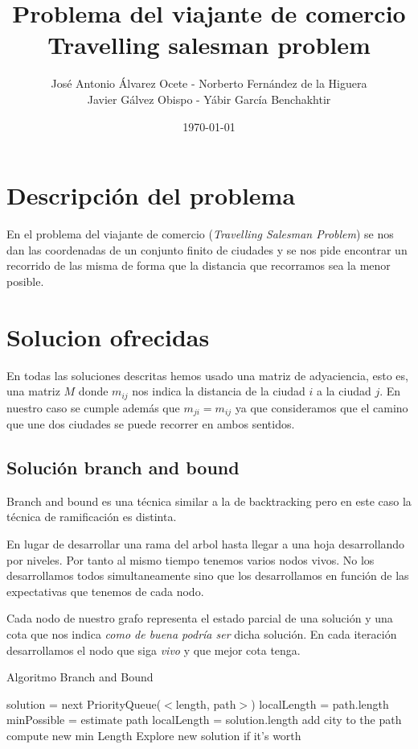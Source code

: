 \documentclass{article}
\title{Problema del viajante de comercio\\ Travelling salesman problem}
\author{José Antonio Álvarez Ocete - Norberto Fernández de la Higuera \\ Javier Gálvez Obispo - Yábir García Benchakhtir }
\date{\today}
\begin{document}
\maketitle
\newpage
\tableofcontents
\newpage

\section{Descripción del problema}

En el problema del viajante de comercio (\textit{Travelling Salesman
  Problem}) se nos dan las coordenadas de un conjunto finito de
ciudades y se nos pide encontrar un recorrido de las misma de forma
que la distancia que recorramos sea la menor posible.

\section{Solucion ofrecidas}

En todas las soluciones descritas hemos usado una matriz de
adyaciencia, esto es, una matriz $M$ donde $m_{ij}$ nos indica la
distancia de la ciudad $i$ a la ciudad $j$. En nuestro caso se cumple
además que $m_{ji} = m_{ij}$ ya que consideramos que el camino que une
dos ciudades se puede recorrer en ambos sentidos.

\subsection{Solución branch and bound}

Branch and bound es una técnica similar a la de backtracking pero en
este caso la técnica de ramificación es distinta.

En lugar de desarrollar una rama del arbol hasta llegar a una hoja
desarrollando por niveles. Por tanto al mismo tiempo tenemos varios
nodos vivos. No los desarrollamos todos simultaneamente sino que los
desarrollamos en función de las expectativas que tenemos de cada nodo.

Cada nodo de nuestro grafo representa el estado parcial de una
solución y una cota que nos indica \textit{como de buena podría ser}
dicha solución. En cada iteración desarrollamos el nodo que siga
\textit{vivo} y que mejor cota tenga.


\begin{algorithm}[H]
\caption{Algoritmo Branch and Bound}
\begin{algorithmic}
\State solution = next PriorityQueue($<$length, path$>$)
\State localLength = path.length
\Else
\State minPossible = estimate path
\State localLength = solution.length
\EndIf
{}
\State add city to the path
\State compute new min Length
\State Explore new solution if it's worth
\EndFor
\EndIf
\end{algorithmic}
\end{algorithm}
\end{document}
